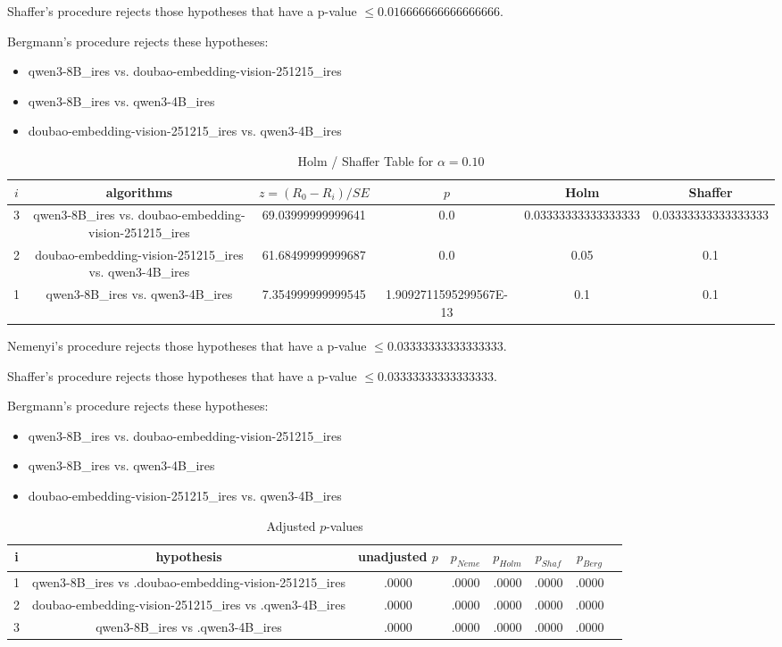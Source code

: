 \documentclass[a4paper,10pt]{article}
\begin{document}
\begin{landscape}
Shaffer's procedure rejects those hypotheses that have a p-value $\le0.016666666666666666$.


Bergmann's procedure rejects these hypotheses:


\begin{itemize}


\item qwen3-8B_ires vs. doubao-embedding-vision-251215_ires\item qwen3-8B_ires vs. qwen3-4B_ires\item doubao-embedding-vision-251215_ires vs. qwen3-4B_ires\end{itemize}


\begin{table}[!htp]
\centering\tiny
\caption{Holm / Shaffer Table for $\alpha=0.10$}
\begin{tabular}{cccccc}
$i$&algorithms&$z=(R_0 - R_i)/SE$&$p$&Holm&Shaffer\\
\hline
3&qwen3-8B_ires vs. doubao-embedding-vision-251215_ires&69.03999999999641&0.0&0.03333333333333333&0.03333333333333333\\2&doubao-embedding-vision-251215_ires vs. qwen3-4B_ires&61.68499999999687&0.0&0.05&0.1\\1&qwen3-8B_ires vs. qwen3-4B_ires&7.354999999999545&1.9092711595299567E-13&0.1&0.1\\\hline
\end{tabular}
\end{table}
Nemenyi's procedure rejects those hypotheses that have a p-value $\le0.03333333333333333$.


Shaffer's procedure rejects those hypotheses that have a p-value $\le0.03333333333333333$.


Bergmann's procedure rejects these hypotheses:


\begin{itemize}


\item qwen3-8B_ires vs. doubao-embedding-vision-251215_ires
\item qwen3-8B_ires vs. qwen3-4B_ires
\item doubao-embedding-vision-251215_ires vs. qwen3-4B_ires
\end{itemize}


\begin{table}[!htp]
\centering\tiny
\caption{Adjusted $p$-values}
\begin{tabular}{cccccccc}
i&hypothesis&unadjusted $p$&$p_{Neme}$&$p_{Holm}$&$p_{Shaf}$&$p_{Berg}$\\
\hline
1&qwen3-8B_ires vs .doubao-embedding-vision-251215_ires&.0000&.0000&.0000&.0000&.0000\\2&doubao-embedding-vision-251215_ires vs .qwen3-4B_ires&.0000&.0000&.0000&.0000&.0000\\3&qwen3-8B_ires vs .qwen3-4B_ires&.0000&.0000&.0000&.0000&.0000\\\hline
\end{tabular}
\end{table}

\end{landscape}
\end{document}
